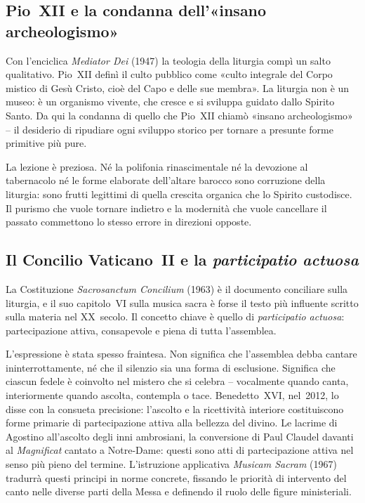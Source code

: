 \documentclass[12pt,a4paper]{article}
\begin{document}
	\subsection{Pio~XII e la condanna dell'«insano archeologismo»}
	
	Con l'enciclica \emph{Mediator Dei} (1947) la teologia della liturgia compì un
	salto qualitativo. Pio~XII definì il culto pubblico come «culto integrale del
	Corpo mistico di Gesù Cristo, cioè del Capo e delle sue membra». La liturgia
	non è un museo: è un organismo vivente, che cresce e si sviluppa guidato dallo
	Spirito Santo. Da qui la condanna di quello che Pio~XII chiamò «insano
	archeologismo» -- il desiderio di ripudiare ogni sviluppo storico per tornare a
	presunte forme primitive più pure.
	
	La lezione è preziosa. Né la polifonia rinascimentale né la devozione al
	tabernacolo né le forme elaborate dell'altare barocco sono corruzione della
	liturgia: sono frutti legittimi di quella crescita organica che lo Spirito
	custodisce. Il purismo che vuole tornare indietro e la modernità che vuole
	cancellare il passato commettono lo stesso errore in direzioni opposte.
	
	\subsection{Il Concilio Vaticano~II e la \emph{participatio actuosa}}
	
	La Costituzione \emph{Sacrosanctum Concilium} (1963) è il documento conciliare
	sulla liturgia, e il suo capitolo~VI sulla musica sacra è forse il testo più
	influente scritto sulla materia nel XX~secolo. Il concetto chiave è quello di
	\emph{participatio actuosa}: partecipazione attiva, consapevole e piena di tutta
	l'assemblea.
	
	L'espressione è stata spesso fraintesa. Non significa che l'assemblea debba
	cantare ininterrottamente, né che il silenzio sia una forma di esclusione.
	Significa che ciascun fedele è coinvolto nel mistero che si celebra --
	vocalmente quando canta, interiormente quando ascolta, contempla o tace.
	Benedetto~XVI, nel~2012, lo disse con la consueta precisione: l'ascolto e la
	ricettività interiore costituiscono forme primarie di partecipazione attiva alla
	bellezza del divino. Le lacrime di Agostino all'ascolto degli inni ambrosiani, la
	conversione di Paul Claudel davanti al \emph{Magnificat} cantato a Notre-Dame:
	questi sono atti di partecipazione attiva nel senso più pieno del termine.
	L'istruzione applicativa \emph{Musicam Sacram} (1967) tradurrà questi principi
	in norme concrete, fissando le priorità di intervento del canto nelle diverse
	parti della Messa e definendo il ruolo delle figure ministeriali.
	
\end{document}
